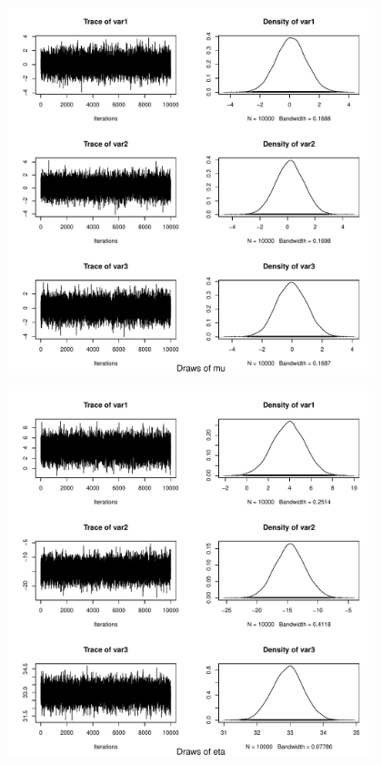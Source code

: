 \documentclass[10pt]{article}
\begin{document}
\begin{figure}
\centering
\includegraphics[width=0.95\textwidth]{figures/diag-mu.pdf}
\caption{}
\label{fig:diag-mu}
\end{figure}

\begin{figure}
\centering
\includegraphics[width=0.95\textwidth]{figures/diag-eta.pdf}
\caption{}
\label{fig:diag-eta}
\end{figure}
\end{document}
